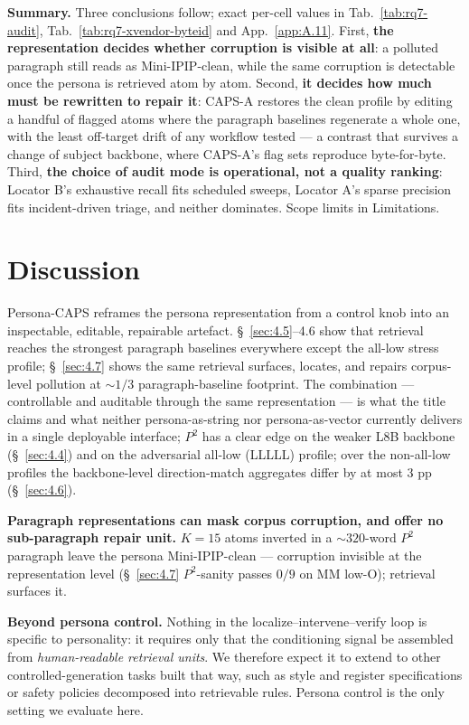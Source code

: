 \textbf{Summary.} Three conclusions follow; exact per-cell values in Tab.~\ref{tab:rq7-audit}, Tab.~\ref{tab:rq7-xvendor-byteid} and App.~\ref{app:A.11}. First, \textbf{the representation decides whether corruption is visible at all}: a polluted paragraph still reads as Mini-IPIP-clean, while the same corruption is detectable once the persona is retrieved atom by atom. Second, \textbf{it decides how much must be rewritten to repair it}: CAPS-A restores the clean profile by editing a handful of flagged atoms where the paragraph baselines regenerate a whole one, with the least off-target drift of any workflow tested --- a contrast that survives a change of subject backbone, where CAPS-A's flag sets reproduce byte-for-byte. Third, \textbf{the choice of audit mode is operational, not a quality ranking}: Locator B's exhaustive recall fits scheduled sweeps, Locator A's sparse precision fits incident-driven triage, and neither dominates. Scope limits in Limitations.

\section{Discussion}
\label{sec:5}

Persona-CAPS reframes the persona representation from a control knob into an inspectable, editable, repairable artefact. \S~\ref{sec:4.5}--4.6 show that retrieval reaches the strongest paragraph baselines everywhere except the all-low stress profile; \S~\ref{sec:4.7} shows the same retrieval surfaces, locates, and repairs corpus-level pollution at $\sim 1/3$ paragraph-baseline footprint. The combination --- controllable and auditable through the same representation --- is what the title claims and what neither persona-as-string nor persona-as-vector currently delivers in a single deployable interface; $P^{\!2}$ has a clear edge on the weaker L8B backbone (\S~\ref{sec:4.4}) and on the adversarial all-low (LLLLL) profile; over the non-all-low profiles the backbone-level direction-match aggregates differ by at most 3 pp (\S~\ref{sec:4.6}).

\textbf{Paragraph representations can mask corpus corruption, and offer no sub-paragraph repair unit.} $K{=}15$ atoms inverted in a $\sim 320$-word $P^{\!2}$ paragraph leave the persona Mini-IPIP-clean --- corruption invisible at the representation level (\S~\ref{sec:4.7} $P^{\!2}$-sanity passes $0/9$ on MM low-O); retrieval surfaces it.

\textbf{Beyond persona control.} Nothing in the localize--intervene--verify loop is specific to personality: it requires only that the conditioning signal be assembled from \textit{human-readable retrieval units}. We therefore expect it to extend to other controlled-generation tasks built that way, such as style and register specifications or safety policies decomposed into retrievable rules. Persona control is the only setting we evaluate here.

